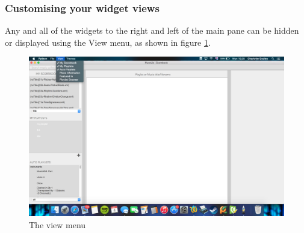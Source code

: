 \subsubsection{Customising your widget views}
Any and all of the widgets to the right and left of the main pane can be hidden or displayed using the View menu, as shown in figure \ref{fig:view}.

\begin{figure}[H]
\centering
\includegraphics[width=500pt]{view}
\caption{The view menu}
\label{fig:view}	
\end{figure}


